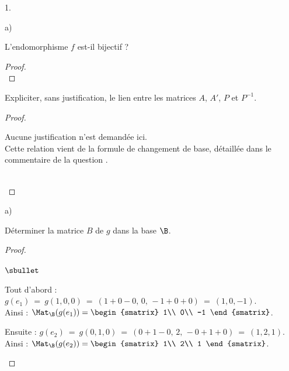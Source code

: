 \documentclass[11pt]{article}%
\begin{document}
\begin{noliste}{1.}
\begin{noliste}{a)}
    
    \item L'endomorphisme $f$ est-il bijectif ?
    
    \begin{proof}~
      ~\\[-1cm]
    \end{proof}

    
    \item Expliciter, sans justification, le lien entre les matrices 
    $A$, $A'$, $P$ et $P^{-1}$.
    
    \begin{proof}~
      
      \begin{remark}
        Aucune justification n'est demandée ici.\\
        Cette relation vient de la formule de changement de base, 
        détaillée dans le commentaire de la question .
      \end{remark}~\\[-1.4cm]
    \end{proof}
  \end{noliste}
  
  \item 
  \begin{noliste}{a)}
    \setlength{\itemsep}{2mm}
    \item Déterminer la matrice $B$ de $g$ dans la base $\B$.
    
    \begin{proof}~
      \begin{noliste}{$\sbullet$}
	\item Tout d'abord : $g(e_1) \ = \ g(1,0,0) \ = \ (1+0-0, \, 0, 
	\, -1+0+0) \ = \ (1,0,-1)$. \\[.1cm]
	Ainsi : $\Mat_\B(g(e_1)) = 
	\begin{smatrix}
	  1\\
	  0\\
	  -1
	\end{smatrix}$.
	
	\item Ensuite : $g(e_2) \ = \ g(0,1,0) \ = \ (0+1-0, \, 2, \, -0
	+1+0) \ = \ (1,2,1)$. \\[.1cm]
	Ainsi : $\Mat_\B(g(e_2)) = 
	\begin{smatrix}
	  1\\
	  2\\
	  1
	\end{smatrix}$.
	

\end{noliste}
\end{proof}
\end{noliste}
\end{noliste}
\end{document}
